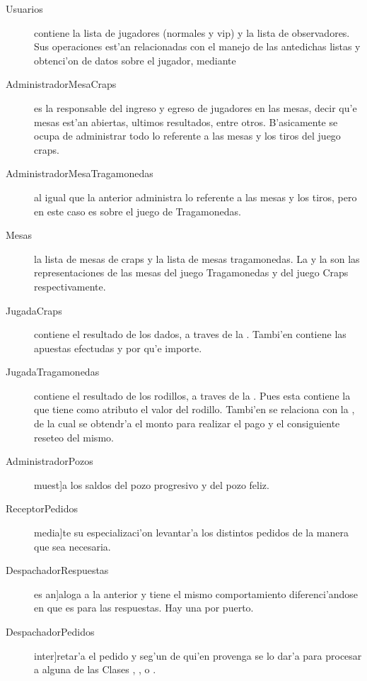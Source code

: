\begin{description}
\item[Usuarios] contiene la lista de jugadores (normales y vip) y la lista de observadores.
Sus operaciones est'an relacionadas con el manejo de las antedichas listas y obtenci'on de datos sobre el jugador, mediante 

\item[AdministradorMesaCraps] es la responsable del ingreso y egreso de jugadores en las mesas, decir qu'e mesas est'an abiertas, ultimos resultados, entre otros. B'asicamente se ocupa de administrar todo lo referente a las mesas y los tiros del juego craps.

\item[AdministradorMesaTragamonedas] al igual que la anterior administra lo referente a las mesas y los tiros, pero en este caso es sobre el juego de Tragamonedas.

\item[Mesas] la lista de mesas de craps y la lista de mesas tragamonedas. La  y la  son las representaciones de las mesas del juego Tragamonedas y del juego Craps respectivamente. 

\item[JugadaCraps] contiene el resultado de los dados, a traves de la . Tambi'en contiene las apuestas efectudas y por qu'e importe.

\item[JugadaTragamonedas] contiene el resultado de los rodillos, a traves de la . Pues esta contiene la  que tiene como atributo el valor del rodillo.
Tambi'en se relaciona con la , de la cual se obtendr'a el monto para realizar el pago y el consiguiente reseteo del mismo.

\item[AdministradorPozos] muest]a los saldos del pozo progresivo y del pozo feliz.

\item[ReceptorPedidos] media]te su especializaci'on levantar'a los distintos pedidos de la manera que sea necesaria.

\item[DespachadorRespuestas] es an]aloga a la anterior y tiene el mismo comportamiento diferenci'andose en que es para las respuestas. Hay una por puerto.

\item[DespachadorPedidos] inter]retar'a el pedido y seg'un de qui'en provenga se lo dar'a para procesar a alguna de las Clases , ,  o . 

\end{description}

